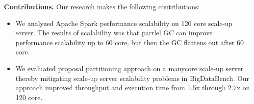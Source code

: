 
\textbf{Contributions.} Our research makes the following contributions:
\begin{itemize}
\item 
We analyzed Apache Spark performance scalability on 120 core scale-up server.
The results of scalability was that parrlel GC can improve performance
scalability up to 60 core, but then the GC flattens out after 60 core.
\item 
We evaluated proposal partitioning approach on a manycore scale-up
server thereby mitigating scale-up server scalability problems in BigDataBench.
Our approach improved throughput and execution time from 1.5x through
2.7x on 120 core.
\end{itemize}


